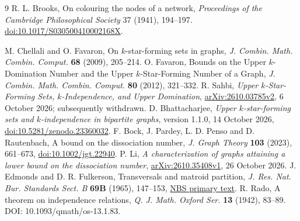 \documentclass[11pt]{article}
\begin{document}
\begingroup
\small
\begin{thebibliography}{9}
 R. L. Brooks, On colouring the nodes of a network,
\emph{Proceedings of the Cambridge Philosophical Society} 37 (1941), 194--197.
\href{https://doi.org/10.1017/S030500410002168X}{doi:10.1017/S030500410002168X}.

\setlength{\itemsep}{2pt}
 M. Chellali and O. Favaron,
On $k$-star-forming sets in graphs,
\emph{J. Combin. Math. Combin. Comput.} \textbf{68} (2009), 205--214.
 O. Favaron,
Bounds on the Upper $k$-Domination Number and the Upper $k$-Star-Forming
Number of a Graph,
\emph{J. Combin. Math. Combin. Comput.} \textbf{80} (2012), 321--332.
 R. Sahbi,
\emph{Upper $k$-Star-Forming Sets, $k$-Independence, and Upper Domination},
\href{https://arxiv.org/abs/2610.03785v2}{arXiv:2610.03785v2},
6 October 2026; subsequently withdrawn.
 D. Bhattacharjee,
\emph{Upper $k$-star-forming sets and $k$-independence in bipartite graphs},
version 1.1.0, 14 October 2026,
\href{https://doi.org/10.5281/zenodo.23360032}{doi:10.5281/zenodo.23360032}.
 F. Bock, J. Pardey, L. D. Penso and D. Rautenbach,
A bound on the dissociation number,
\emph{J. Graph Theory} \textbf{103} (2023), 661--673,
\href{https://doi.org/10.1002/jgt.22940}{doi:10.1002/jgt.22940}.
 P. Li,
\emph{A characterization of graphs attaining a lower bound on the
dissociation number},
\href{https://arxiv.org/abs/2610.35408v1}{arXiv:2610.35408v1}, 26 October 2026.
 J. Edmonds and D. R. Fulkerson,
Transversals and matroid partition,
\emph{J. Res. Nat. Bur. Standards Sect. B} \textbf{69B} (1965), 147--153,
\href{https://nvlpubs.nist.gov/nistpubs/jres/69B/jresv69Bn3p147_A1b.pdf}{NBS primary text}.
 R. Rado, A theorem on independence relations,
\emph{Q. J. Math. Oxford Ser.} \textbf{13} (1942), 83--89.
DOI: 10.1093/qmath/os-13.1.83.
\end{thebibliography}
\endgroup
\end{document}
